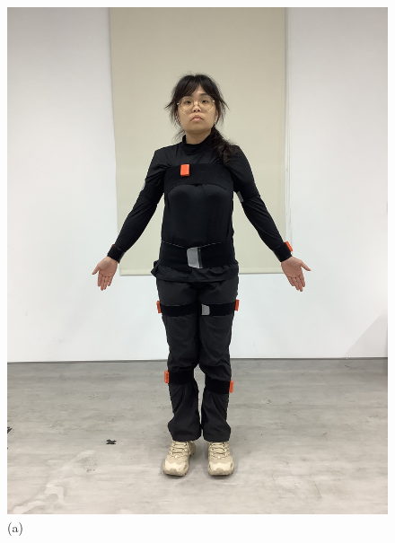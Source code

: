 \begin{figure}[!ht]
   \centering
   \begin{minipage}{.25\textwidth}
     \centering
     \includegraphics[width=\linewidth, angle=-90]{figure/ch3_fig_frontimu.JPG}
     \caption*{(a)}
   \end{minipage}%
   \begin{minipage}{.25\textwidth}
      \centering

\end{minipage}
\end{figure}
